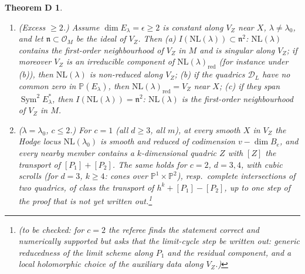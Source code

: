 \documentclass[10pt]{article}
\numberwithin{equation}{section}
\newtheorem*{thmD}{Theorem D}
\theoremstyle{remark}
\newcommand{\PP}{\mathbb{P}}
\newcommand{\NL}{\mathrm{NL}}
\newcommand{\VZ}{V_Z}
\newcommand{\cD}{\mathcal{D}}
\newcommand{\tbc}[1]{\footnote{(to be checked: #1)}}
\begin{document}
\begin{thmD}
\begin{enumerate}[label=\textup{(\arabic*)}]
$\cD(u_0)\neq0$ \textup{(}that is, $\cD_L(u_0)\neq0$ for some such $L$\textup{)}, then
$\NL(\lambda)=\{y^2=0\}$: $\VZ$ with its double structure in $M$. If $\cD(u_0)=0$ at $X$
but $\cD\not\equiv0$ on $\VZ$, then $\NL(\lambda)=2\VZ\cup W$ with $W=V(h_L)\not\supset\VZ$.\tbc{the further
statement $W\cap\VZ=\{\cD=0\}$ needs that all dependent conditions lie in $I(P_1)\cap I(P_2)+J$; the referee
asks for the lemma ``(H) implies that $\cdot\det C$ is surjective'', which is not written.}
\item \textup{(Excess $\ge2$.)} Assume $\dim E_\lambda=\epsilon\ge2$ is constant along $\VZ$ near $X$,
$\lambda\ne\lambda_0$, and let $\mathfrak n\subset\mathcal O_M$ be the ideal of $\VZ$. Then
\textup{(a)} $I(\NL(\lambda))\subset\mathfrak n^2$: $\NL(\lambda)$ contains the first-order neighbourhood of
$\VZ$ in $M$ and is singular along $\VZ$; if moreover $\VZ$ is an irreducible component of
$\NL(\lambda)_{\mathrm{red}}$ \textup{(}for instance under \textup{(b))}, then $\NL(\lambda)$ is non-reduced
along $\VZ$;
\textup{(b)} if the quadrics $\cD_L$ have no common zero in $\PP(E_\lambda)$, then
$\NL(\lambda)_{\mathrm{red}}=\VZ$ near $X$; \textup{(c)} if they span $\operatorname{Sym}^2E_\lambda^*$, then
$I(\NL(\lambda))=\mathfrak n^2$: $\NL(\lambda)$ is the first-order neighbourhood of $\VZ$ in $M$.
\item \textup{($\lambda=\lambda_0$, $c\le2$.)} For $c=1$ \textup{(}all $d\ge3$, all $m$\textup{)}, at every smooth
$X$ in $\VZ$ the Hodge locus $\NL(\lambda_0)$ is smooth and reduced of codimension $v-\dim B_e$, and every
nearby member contains a $k$-dimensional quadric $Z$ with $[Z]$ the transport of $[P_1]+[P_2]$. The same holds
for $c=2$, $d=3,4$, with cubic scrolls \textup{(}for $d=3$, $k\ge4$: cones over $\PP^1\times\PP^2$\textup{)},
resp.\ complete intersections of two quadrics, of class the transport
of $h^k+[P_1]-[P_2]$, up to one step of the proof that is not yet written out.\tbc{for $c=2$ the referee finds
the statement correct and numerically supported but asks that the limit-cycle step be written out: generic
reducedness of the limit scheme along $P_1$ and the residual component, and a local holomorphic choice of the
auxiliary data along $\VZ$.}
\end{enumerate}
\end{thmD}
\end{document}
